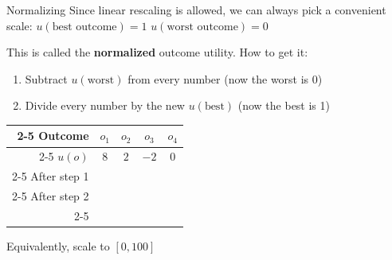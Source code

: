 \begin{frame}{Normalizing}
Since linear rescaling is allowed, we can always pick a convenient scale:
\bsk
\centering
\large
$u(\text{best outcome})=1$ \qquad\qquad $u(\text{worst outcome})=0$
\normalsize
\bsk
\raggedright
This is called the \textbf{normalized} outcome utility. How to get it:
\begin{enumerate}
    \item Subtract $u(\text{worst})$ from every number \hfill (now the worst is 0)
    \item Divide every number by the new $u(\text{best})$ \hfill (now the best is 1)
\end{enumerate}
\bsk
\centering
\renewcommand{\arraystretch}{1.5}
\begin{tabular}{r|c|c|c|c|}
\cline{2-5}
Outcome & $o_1$ & $o_2$ & $o_3$ & $o_4$ \\
\cline{2-5}
$u(o)$ & $8$ & $2$ & $-2$ & $0$ \\
\cline{2-5}
After step 1 & \hspace{0.5in} & \hspace{0.5in} & \hspace{0.5in} & \hspace{0.5in} \\
\cline{2-5}
After step 2 & & & & \\
\cline{2-5}
\end{tabular}
\raggedright

{\footnotesize Equivalently, scale to $[0,100]$}
\end{frame}



